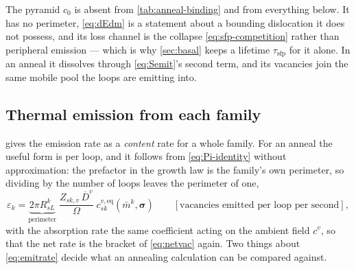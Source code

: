 \documentclass{article}
\begin{document}
The pyramid $c_0$ is absent from \cref{tab:anneal-binding} and from everything
below. It has no perimeter, \cref{eq:dEdm} is a statement about a bounding
dislocation it does not possess, and its loss channel is the collapse
\cref{eq:sfp-competition} rather than peripheral emission --- which is why
\cref{sec:basal} keeps a lifetime $\tau_{\mathrm{sfp}}$ for it alone. In an
anneal it dissolves through \cref{eq:Semit}'s second term, and its vacancies join
the same mobile pool the loops are emitting into.

\subsection{Thermal emission from each family}
\label{sec:anneal-emission}

 gives the emission rate as a \emph{content} rate for a
whole family. For an anneal the useful form is per loop, and it follows from
\cref{eq:Pi-identity} without approximation: the prefactor in the growth law is
the family's own perimeter, so dividing by the number of loops leaves the
perimeter of one,
\begin{equation}
  \varepsilon_k
  =\underbrace{2\pi R^k_{sL}}_{\text{perimeter}}\;
   \frac{Z_{sk,v}\,\overline D^{v}}{\Omega}\;
   c^{v,\mathrm{eq}}_{sk}(\bar m^k,\bm\sigma)
  \qquad[\text{vacancies emitted per loop per second}],
  \label{eq:emitrate}
\end{equation}
with the absorption rate the same coefficient acting on the ambient field
$c^{v}$, so that the net rate is the bracket of \cref{eq:netvac} again. Two
things about \cref{eq:emitrate} decide what an annealing calculation can be
compared against.
\end{document}
